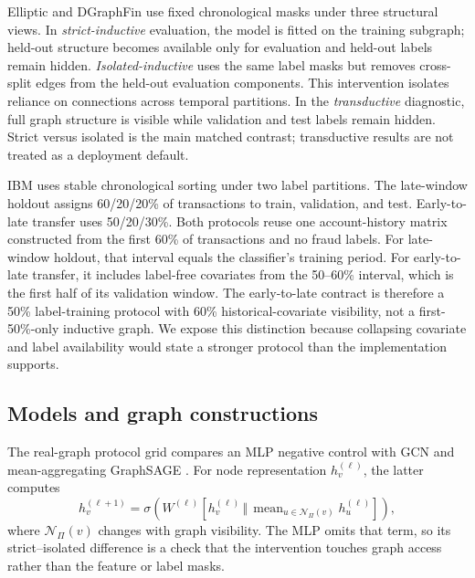 

Elliptic and DGraphFin use fixed chronological masks under three structural views. In \emph{strict-inductive} evaluation, the model is fitted on the training subgraph; held-out structure becomes available only for evaluation and held-out labels remain hidden. \emph{Isolated-inductive} uses the same label masks but removes cross-split edges from the held-out evaluation components. This intervention isolates reliance on connections across temporal partitions. In the \emph{transductive} diagnostic, full graph structure is visible while validation and test labels remain hidden. Strict versus isolated is the main matched contrast; transductive results are not treated as a deployment default.

IBM uses stable chronological sorting under two label partitions. The late-window holdout assigns 60/20/20\% of transactions to train, validation, and test. Early-to-late transfer uses 50/20/30\%. Both protocols reuse one account-history matrix constructed from the first 60\% of transactions and no fraud labels. For late-window holdout, that interval equals the classifier's training period. For early-to-late transfer, it includes label-free covariates from the 50--60\% interval, which is the first half of its validation window. The early-to-late contract is therefore a 50\% label-training protocol with 60\% historical-covariate visibility, not a first-50\%-only inductive graph. We expose this distinction because collapsing covariate and label availability would state a stronger protocol than the implementation supports.

\subsection{Models and graph constructions}
The real-graph protocol grid compares an MLP negative control with GCN \cite{kipf2017gcn} and mean-aggregating GraphSAGE \cite{hamilton2017graphsage}. For node representation $h_v^{(\ell)}$, the latter computes
\begin{equation}
 h_v^{(\ell+1)}=\sigma\!\left(W^{(\ell)}
 [h_v^{(\ell)}\,\Vert\,\operatorname{mean}_{u\in\mathcal{N}_{\Pi}(v)}h_u^{(\ell)}]\right),
 \label{eq:sage}
\end{equation}
where $\mathcal{N}_{\Pi}(v)$ changes with graph visibility. The MLP omits that term, so its strict--isolated difference is a check that the intervention touches graph access rather than the feature or label masks.

